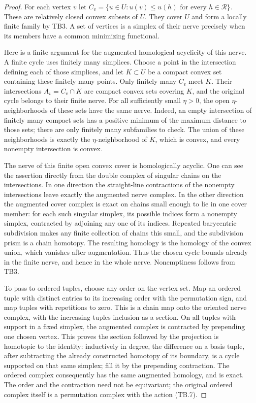 \begin{proof}
For each vertex $v$ let
$C_v=\{u\in U:u(v)\le u(h)\text{ for every }h\in\mathcal R\}$.
These are relatively closed convex subsets of $U$.  They cover $U$
and form a locally finite family by TB3.  A set of vertices is a
simplex of their nerve precisely when its members have a common
minimizing functional.

Here is a finite argument for the augmented homological acyclicity
of this nerve.  A finite cycle uses finitely many simplices.  Choose
a point in the intersection defining each of those simplices,
and let $K\subset U$ be a compact convex set containing these
finitely many points.  Only finitely many $C_v$ meet $K$.  Their
intersections $A_v=C_v\cap K$ are compact convex sets covering
$K$, and the original cycle belongs to their finite nerve.  For
all sufficiently small $\eta>0$, the open $\eta$-neighborhoods
of these sets have the same nerve.  Indeed, an empty intersection
of finitely many compact sets has a positive minimum of the
maximum distance to those sets; there are only finitely many
subfamilies to check.  The union of these neighborhoods is exactly
the $\eta$-neighborhood of $K$, which is convex, and every nonempty
intersection is convex.

The nerve of this finite open convex cover is homologically
acyclic.  One can see the assertion directly from the double
complex of singular chains on the intersections.  In one direction
the straight-line contractions of the nonempty intersections leave
exactly the augmented nerve complex.  In the other direction the
augmented cover complex is exact on chains small enough to lie in
one cover member: for each such singular simplex, its possible
indices form a nonempty simplex, contracted by adjoining any one
of its indices.  Repeated barycentric subdivision makes any finite
collection of chains this small, and the subdivision prism is a
chain homotopy.  The resulting homology is the homology of the
convex union, which vanishes after augmentation.  Thus the chosen
cycle bounds already in the finite nerve, and hence in the whole
nerve.  Nonemptiness follows from TB3.

To pass to ordered tuples, choose any order on the vertex set.
Map an ordered tuple with distinct entries to its increasing order
with the permutation sign, and map tuples with repetitions to
zero.  This is a chain map onto the oriented nerve complex, with
the increasing-tuples inclusion as a section.  On all tuples with
support in a fixed simplex, the augmented complex is contracted
by prepending one chosen vertex.  This proves the section followed
by the projection is homotopic to the identity: inductively in
degree, the difference on a basis tuple, after subtracting the
already constructed homotopy of its boundary, is a cycle supported
on that same simplex; fill it by the prepending contraction.
The ordered complex consequently has the same augmented homology,
and is exact.  The order and the contraction need not be equivariant;
the original ordered complex itself is a permutation complex with
the action (TB.7).


\end{proof}

